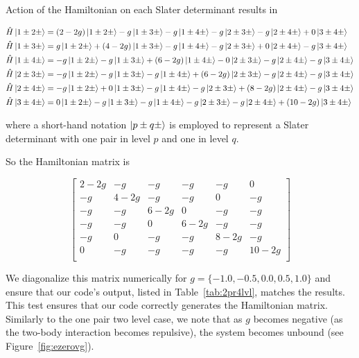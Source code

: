 \documentclass[11pt]{article}
\begin{document}

Action of the Hamiltonian on each Slater determinant results in

\begin{align*}
&\hat{H}\ket{1\pm2\pm}=(2-2g)\ket{1\pm2\pm}-g\ket{1\pm3\pm}-g\ket{1\pm4\pm}-g\ket{2\pm3\pm}-g\ket{2\pm4\pm}+0\ket{3\pm4\pm}   \\
&\hat{H}\ket{1\pm3\pm}=g\ket{1\pm2\pm}+(4-2g)\ket{1\pm3\pm}-g\ket{1\pm4\pm}-g\ket{2\pm3\pm}+0\ket{2\pm4\pm}-g\ket{3\pm4\pm}   \\
&\hat{H}\ket{1\pm4\pm}=-g\ket{1\pm2\pm}-g\ket{1\pm3\pm}+(6-2g)\ket{1\pm4\pm}-0\ket{2\pm3\pm}-g\ket{2\pm4\pm}-g\ket{3\pm4\pm}   \\
&\hat{H}\ket{2\pm3\pm}=-g\ket{1\pm2\pm}-g\ket{1\pm3\pm}-g\ket{1\pm4\pm}+(6-2g)\ket{2\pm3\pm}-g\ket{2\pm4\pm}-g\ket{3\pm4\pm}   \\ 
&\hat{H}\ket{2\pm4\pm}=-g\ket{1\pm2\pm}+0\ket{1\pm3\pm}-g\ket{1\pm4\pm}-g\ket{2\pm3\pm}+(8-2g)\ket{2\pm4\pm}-g\ket{3\pm4\pm}   \\
&\hat{H}\ket{3\pm4\pm}=0\ket{1\pm2\pm}-g\ket{1\pm3\pm}-g\ket{1\pm4\pm}-g\ket{2\pm3\pm}-g\ket{2\pm4\pm}+(10-2g)\ket{3\pm4\pm}   
\end{align*}


where a short-hand notation $\ket{p \pm q \pm}$ is employed to represent a Slater determinant with one pair in level $p$ and one in level $q$.

So the Hamiltonian matrix is

\begin{equation}
\begin{bmatrix}
2-2g   &  -g   &   -g   &   -g    &   -g    &    0    \\
  -g   &4-2g   &   -g   &   -g    &    0    &   -g    \\
  -g   &  -g   & 6-2g   &    0    &   -g    &   -g    \\
  -g   &  -g   &   0   & 6-2g    &   -g    &   -g    \\
  -g   &   0   &   -g   &   -g    & 8-2g    &   -g    \\
   0   &  -g   &   -g   &   -g    &   -g    & 10-2g    \\
\end{bmatrix}
\label{eq:ham6mtx}
\end{equation}

We diagonalize this matrix numerically for $g=\{ -1.0, -0.5, 0.0, 0.5, 1.0 \}$ and ensure that our code's output, listed in Table~\ref{tab:2pr4lvl}, matches the results. This test ensures that our code correctly generates the Hamiltonian matrix. Similarly to the one pair two level case, we note that as $g$ becomes negative (as the two-body interaction becomes repulsive), the system becomes unbound (see Figure~\ref{fig:ezerovg}).
\end{document}
